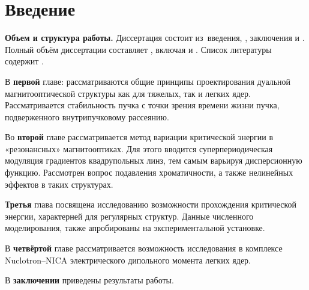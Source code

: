 \chapter*{Введение}                         %

\newcommand{\actuality}{}
\newcommand{\progress}{}
\newcommand{\aim}{{\textbf\aimTXT}}
\newcommand{\tasks}{\textbf{\tasksTXT}}
\newcommand{\novelty}{\textbf{\noveltyTXT}}
\newcommand{\influence}{\textbf{\influenceTXT}}
\newcommand{\methods}{\textbf{\methodsTXT}}
\newcommand{\defpositions}{\textbf{\defpositionsTXT}}
\newcommand{\reliability}{\textbf{\reliabilityTXT}}
\newcommand{\probation}{\textbf{\probationTXT}}
\newcommand{\contribution}{\textbf{\contributionTXT}}
\newcommand{\publications}{\textbf{\publicationsTXT}}


\textbf{Объем и структура работы.} Диссертация состоит из~введения,
,
заключения и
.
%
Полный объём диссертации составляет
, включая
 и
.
Список литературы содержит
.

В \textbf{первой} главе: рассматриваются общие принципы проектирования дуальной магнитооптической структуры как для тяжелых, так и легких ядер. Рассматривается стабильность пучка с точки зрения времени жизни пучка, подверженного внутрипучковому рассеянию.

Во \textbf{второй} главе рассматривается метод вариации критической энергии в «резонансных» магнитооптиках. Для этого вводится суперпериодическая модуляция градиентов квадрупольных линз, тем самым варьируя дисперсионную функцию. Рассмотрен вопрос подавления хроматичности, а также нелинейных эффектов в таких структурах.

\textbf{Третья} глава посвящена исследованию возможности прохождения критической энергии, характерней для регулярных структур. Данные численного моделирования, также апробированы на экспериментальной установке.  

В \textbf{четвёртой} главе рассматривается возможность исследования в комплексе Nuclotron–NICA электрического дипольного момента легких ядер.

В \textbf{заключении} приведены результаты работы.